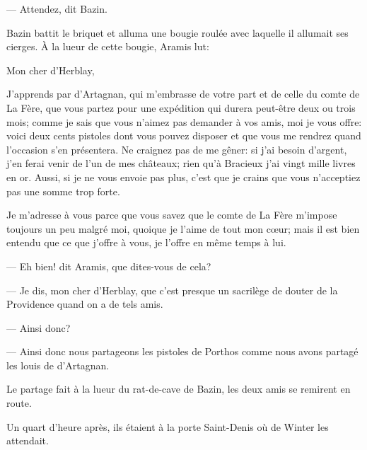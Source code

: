 — Attendez, dit Bazin.

Bazin battit le briquet et alluma une bougie roulée avec laquelle il allumait ses cierges. À la lueur de cette bougie, Aramis lut:

\begin{mail}{}{Mon cher d'Herblay,}

J'apprends par d'Artagnan, qui m'embrasse de votre part et de celle du comte de La Fère, que vous partez pour une expédition qui durera peut-être deux ou trois mois; comme je sais que vous n'aimez pas demander à vos amis, moi je vous offre: voici deux cents pistoles dont vous pouvez disposer et que vous me rendrez quand l'occasion s'en présentera. Ne craignez pas de me gêner: si j'ai besoin d'argent, j'en ferai venir de l'un de mes châteaux; rien qu'à Bracieux j'ai vingt mille livres en or. Aussi, si je ne vous envoie pas plus, c'est que je crains que vous n'acceptiez pas une somme trop forte.

Je m'adresse à vous parce que vous savez que le comte de La Fère m'impose toujours un peu malgré moi, quoique je l'aime de tout mon cœur; mais il est bien entendu que ce que j'offre à vous, je l'offre en même temps à lui.

\end{mail}

— Eh bien! dit Aramis, que dites-vous de cela?

— Je dis, mon cher d'Herblay, que c'est presque un sacrilège de douter de la Providence quand on a de tels amis.

— Ainsi donc?

— Ainsi donc nous partageons les pistoles de Porthos comme nous avons partagé les louis de d'Artagnan.

Le partage fait à la lueur du rat-de-cave de Bazin, les deux amis se remirent en route.

Un quart d'heure après, ils étaient à la porte Saint-Denis où de Winter les attendait.